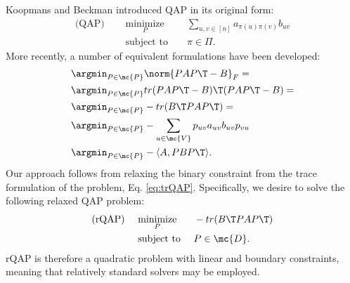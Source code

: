 \documentclass[10pt,journal,cspaper,compsoc]{IEEEtran}
\newcommand{\PmcP}{P \in \mc{P}}
\begin{document}
Koopmans and Beckman \cite{Koopmans1957} introduced QAP in its original form:
\begin{subequations}
\begin{align}
	\text{(QAP) } \quad &\underset{P}{\text{minimize}}  &&\sum_{u,v \in [n]} a_{\pi(u)\pi(v)} b_{uv}  \\
	&\text{subject to } && \pi \in \Pi.
\end{align}
\end{subequations}
More recently, a number of equivalent formulations have been developed:
\begin{subequations} \label{eq:QAP}
\begin{align}
	&\argmin_{\PmcP} \norm{PAP\T - B}_F = \\
	&\argmin_{\PmcP} tr(PAP\T - B)\T (PAP\T - B)  = \\
	&\argmin_{\PmcP} - tr(B\T PAP\T)= \label{eq:trQAP}\\ %
	&\argmin_{\PmcP}  -\sum_{u \in \mc{V}} p_{uv} a_{uv} b_{uv} p_{vu} 
	\\&\argmin_{\PmcP}  -\langle A, PBP\T \rangle.
\end{align}
\end{subequations}
Our approach follows from relaxing the binary constraint from the trace formulation of the problem, Eq. \eqref{eq:trQAP}.  Specifically, we desire to solve the following relaxed QAP problem:
\begin{subequations} \label{eq:rQAP}
\begin{align}
		\text{(rQAP) } \quad &\underset{P}{\text{minimize}}  && - tr(B\T PAP\T)  \\
		&\text{subject to } && P \in \mc{D}.
\end{align}
\end{subequations}
rQAP is therefore a quadratic problem with linear and boundary constraints, meaning that relatively standard solvers may be employed.
\end{document}
